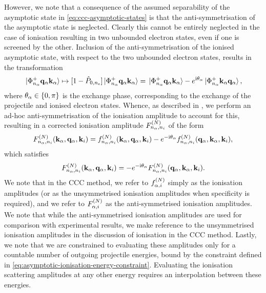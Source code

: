 \documentclass[]{article}
\begin{document}
However, we note that a consequence of the assumed separability of the
asymptotic state in \eqref{eq:ccc-asymptotic-states} is that the
anti-symmetrisation of the asymptotic state is neglected.
Clearly this cannot be entirely neglected in the case of ionisation resulting in
two unbounded electron states, even if one is screened by the other.
Inclusion of the anti-symmetrisation of the ionised asymptotic state, with
respect to the two unbounded electron states, results in the transformation
\begin{equation}
  \label{eq:asymptotic-ionised-anti-symmetrised}
  \ket*{\Phi_{n_{\alpha}}^{+} \vb{q}_{\alpha} \vb{k}_{\alpha}}
  \mapsto
  [1 - \hat{P}_{0, n_{\mathrm{e}}}]
  \ket*{\Phi_{n_{\alpha}}^{+} \vb{q}_{\alpha} \vb{k}_{\alpha}}
  =
  \ket*{\Phi_{n_{\alpha}}^{+} \vb{q}_{\alpha} \vb{k}_{\alpha}}
  -
  e^{\mathrm{i} \theta_{\alpha}}
  \ket*{\Phi_{n_{\alpha}}^{+} \vb{k}_{\alpha} \vb{q}_{\alpha}}
  ,
\end{equation}
where $\theta_{\alpha} \in \lbrace0, \pi\rbrace$ is the exchange phase, corresponding
to the exchange of the projectile and ionised electron states.
Whence, as described in \cite{PhysRevLett.78.4721, PhysRevLett.83.1570,
  PhysRevLett.89.273201}, we perform an ad-hoc anti-symmetrisation of the
ionisation amplitude to account for this, resulting in a corrected ionisation
amplitude $F_{n_{\alpha}, n_{i}}^{(N)}$ of the form
\begin{equation}
  \label{eq:scattering-amplitude-ionisation-anti-symmetrised}
  F_{n_{\alpha}, n_{i}}^{(N)}(
    \vb{k}_{\alpha}, \vb{q}_{\alpha}, \vb{k}_{i}
  )
  =
  f_{n_{\alpha}, n_{i}}^{(N)}(
    \vb{k}_{\alpha}, \vb{q}_{\alpha}, \vb{k}_{i}
  )
  -
  e^{- \mathrm{i} \theta_{\alpha}}
  f_{n_{\alpha}, n_{i}}^{(N)}(
    \vb{q}_{\alpha}, \vb{k}_{\alpha}, \vb{k}_{i}
  )
  ,
\end{equation}
which satisfies
\begin{equation}
  \label{eq:scattering-amplitude-ionisation-anti-symmetrised-constraint}
  F_{n_{\alpha}, n_{i}}^{(N)}(
    \vb{k}_{\alpha}, \vb{q}_{\alpha}, \vb{k}_{i}
  )
  =
  -
  e^{- \mathrm{i} \theta_{\alpha}}
  F_{n_{\alpha}, n_{i}}^{(N)}(
    \vb{q}_{\alpha}, \vb{k}_{\alpha}, \vb{k}_{i}
  )
  .
\end{equation}
We note that in the CCC method, we refer to $f_{\alpha, i}^{(N)}$ simply as
the ionisation amplitudes (or as the unsymmetrised ionisation amplitudes when
specificity is required), and we refer to $F_{\alpha, i}^{(N)}$ as the
anti-symmetrised ionisation amplitudes.
We note that while the anti-symmetrised ionisation amplitudes are used for
comparison with experimental results, we make reference to the unsymmetrised
ionisation amplitudes in the discussion of ionisation in the CCC method.
Lastly, we note that we are constrained to evaluating these amplitudes only for
a countable number of outgoing projectile energies, bound by the constraint
defined in \eqref{eq:asymptotic-ionisation-energy-constraint}.
Evaluating the ionisation scattering amplitudes at any other energy requires
an interpolation between these energies.
\end{document}
